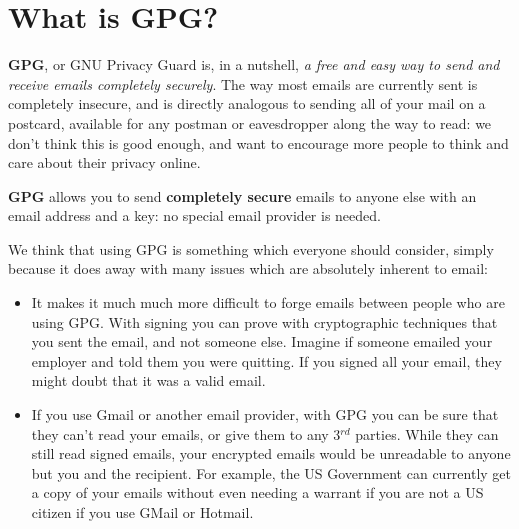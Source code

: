 

\section{What is GPG?}

\textbf{GPG}, or GNU Privacy Guard is, in a nutshell, \textit{a free and easy way to send and receive emails completely securely}. The way most emails are currently sent is completely insecure, and is directly analogous to sending all of your mail on a postcard, available for any postman or eavesdropper along the way to read: we don't think this is good enough, and want to encourage more people to think and care about their privacy online.

\textbf{GPG} allows you to send \textbf{completely secure} emails to anyone else with an email address and a key: no special email provider is needed.

We think that using GPG is something which everyone should consider, simply because it does away with many issues which are absolutely inherent to email:

\begin{itemize}
	\item It makes it much much more difficult to forge emails between people who are using GPG. With signing you can prove with cryptographic techniques that you sent the email, and not someone else. Imagine if someone emailed your employer and told them you were quitting. If you signed all your email, they might doubt that it was a valid email.
	\item If you use Gmail or another email provider, with GPG you can be sure that they can't read your emails, or give them to any 3$^{rd}$ parties. While they can still read signed emails, your encrypted emails would be unreadable to anyone but you and the recipient. For example, the US Government can currently get a copy of your emails without even needing a warrant if you are not a US citizen if you use GMail or Hotmail.
\end{itemize}

